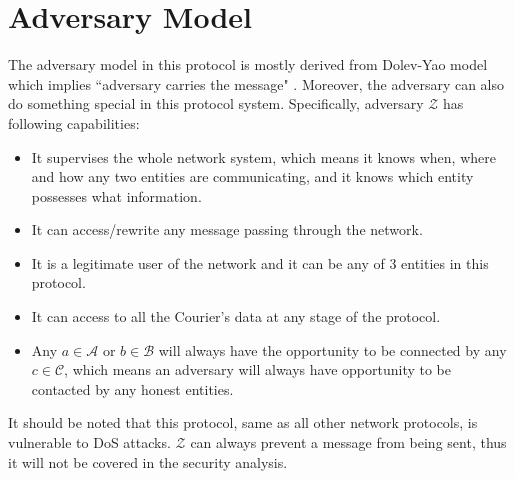 \section{Adversary Model}
The adversary model in this protocol is mostly derived from Dolev-Yao model which implies ``adversary carries the message" \cite{Dolev}. Moreover, the adversary can also do something special in this protocol system. Specifically, adversary $\mathcal{Z}$ has following capabilities:
\begin{itemize}
\item It supervises the whole network system, which means it knows when, where and how any two entities are communicating, and it knows which entity possesses what information.
\item It can access/rewrite any message passing through the network.
\item It is a legitimate user of the network and it can be any of 3 entities in this protocol.
\item It can access to all the Courier's data at any stage of the protocol.
\item Any $a \in \mathcal{A}$ or $b \in \mathcal{B}$ will always have the opportunity to be connected by any $c \in \mathcal{C}$, which means an adversary will always have opportunity to be contacted by any honest entities.
\end{itemize}

It should be noted that this protocol, same as all other network protocols, is vulnerable to DoS attacks. $\mathcal{Z}$ can always prevent a message from being sent, thus it will not be covered in the security analysis.